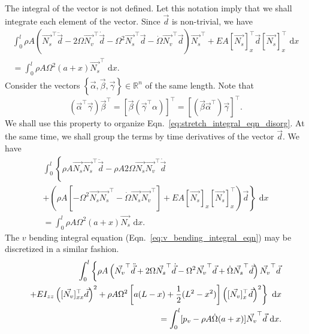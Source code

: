 The integral of the vector is not defined. Let this notation imply that we shall integrate each element of the vector. Since $\vec d$ is non-trivial, we have
\begin{eqnarray}
\label{eq:stretch_integral_eqn_disorg}
\int_0^l \rho A\left(\vec{N_s}^\top\ddot{\vec d}-2\Omega\vec{N_v}^\top\dot{\vec{d}}-\Omega^2\vec{N_s}^\top\vec{d}-\dot\Omega \vec{N_v}^\top\vec{d}\right)\vec{N_s}^\top+EA[\vec{N_s}]_x^\top\vec{d}[\vec{N_s}]_x^\top\text{ d}x \\
= \int_0^l \rho A\Omega^2(a+x)\vec{N_s}^\top\text{ d}x. \nonumber
\end{eqnarray}
Consider the vectors $\left\lbrace\vec{\alpha},\vec{\beta},\vec{\gamma}\right\rbrace\in\mathbb{R}^n$ of the same length. Note that
\begin{equation}
\left(\vec\alpha^\top\vec\gamma\right)\vec\beta^\top = \left[\vec\beta\left(\vec\gamma^\top\alpha\right)\right]^\top =  \left[\left(\vec\beta\vec\alpha^\top\right)\vec\gamma\right]^\top.
\label{eq:vec_prod_transpose}
\end{equation}
We shall use this property to organize Eqn.~\ref{eq:stretch_integral_eqn_disorg}. At the same time, we shall group the terms by time derivatives of the vector $\vec d$. We have
\begin{eqnarray}
\label{eq:s.disc.final}
\int_0^l \left\lbrace\rho A\vec{N_s}\vec{N_s}^\top\ddot{\vec d}-\rho A2\Omega\vec{N_s}\vec{N_v}^\top\dot{\vec{d}}\right. \nonumber \\
\left.+\left(\rho A\left[-\Omega^2\vec{N_s}\vec{N_s}^\top-\dot\Omega \vec{N_s}\vec{N_v}^\top\right]+EA[\vec{N_s}]_x[\vec{N_s}]_x^\top\right)\vec{d}\right\rbrace\text{ d}x \\
 = \int_0^l \rho A\Omega^2(a+x)\vec{N_s}\text{ d}x. \nonumber
\end{eqnarray}
The $v$ bending integral equation (Eqn.~\ref{eq:v_bending_integral_eqn}) may be discretized in a similar fashion.
\begin{eqnarray}
\int_0^l\left\lbrace\rho A\left(\vec{N_v}^\top\ddot{\vec d} + 2\Omega\vec{N_s}^\top\dot{\vec d}-\Omega^2\vec{N_v}^\top\vec{d}+\dot\Omega \vec{N_s}^\top\vec{d}\right)\vec{N_v}^\top\vec{d}\vphantom{\left([\vec{N_v}]_{x}^\top\vec{d}\right)^2}\right.\nonumber \\
\left.+EI_{zz}\left([\vec{N_v}]_{xx}^\top\vec{d}\right)^2+\rho A\Omega^2\left[a(L-x)+\frac{1}{2}(L^2-x^2)\right]\left([\vec{N_v}]_{x}^\top\vec{d}\right)^2\right\rbrace\text{ d}x \\
= \int_0^l[p_v - \rho A\dot\Omega(a+x)]\vec{N_v}^\top\vec{d}\text{ d}x. \nonumber
\end{eqnarray}
